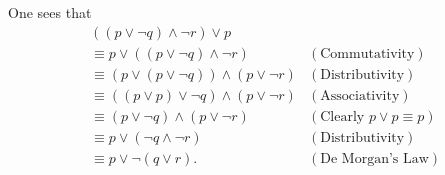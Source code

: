 \begin{questions}
    \item One sees that
    \begin{align*}
        &((p \lor \lnot q) \land \lnot r) \lor p\\
        &\equiv p \lor ((p \lor \lnot q) \land \lnot r) & (\text{Commutativity})\\
        &\equiv (p \lor (p \lor \lnot q)) \land (p \lor \lnot r) & (\text{Distributivity})\\
        &\equiv ((p \lor p) \lor \lnot q) \land (p \lor \lnot r) & (\text{Associativity})\\
        &\equiv (p \lor \lnot q) \land (p \lor \lnot r) & (\text{Clearly } p \lor p \equiv p)\\
        &\equiv p \lor (\lnot q \land \lnot r) & (\text{Distributivity})\\
        &\equiv p \lor \lnot(q \lor r). & (\text{De Morgan's Law})
    \end{align*}
\end{questions}
